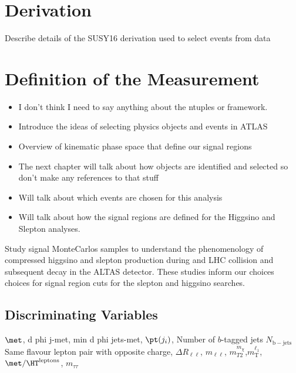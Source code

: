 \section{Derivation}
Describe details of the SUSY16 derivation used to select events from data

 \section{Definition of the Measurement}
 \label{sec:event}
\begin{itemize}
\item I don't think I need to say anything about the ntuples or framework.
\item Introduce the ideas of selecting physics objects and events in ATLAS
\item Overview of kinematic phase space that define our signal regions
\item The next chapter will talk about how objects are identified and selected so don't make any references to that stuff
\item Will talk about which events are chosen for this analysis
\item Will talk about how the signal regions are defined for the Higgsino and Slepton analyses.
\end{itemize}
Study signal MonteCarlos samples to understand the phenomenology of compressed higgsino and slepton production during and LHC collision and subsequent decay in the ALTAS detector.  These studies inform our choices choices for signal region cuts for the slepton and higgsino searches. 

\subsection{Discriminating Variables}
\label{sec:discvar}
$\met$, d phi j-met, min d phi jets-met, $\pt(j_i)$, Number of $b$-tagged jets $N_\mathrm{b-jets}$\\
Same flavour lepton pair with opposite charge, $\Delta R_{\ell\ell}$, $m_{\ell\ell}$, $m_{T2}^{m_{\chi}}$,$m_\text{T}^{\ell_1}$, $\met/\HT^\text{leptons}$, $m_{\tau\tau}$


